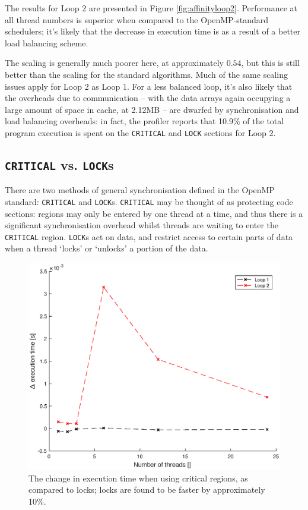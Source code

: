 \documentclass{article} %
\newcommand{\tp}{\texttt}
\begin{document}
The results for Loop 2 are presented in Figure \ref{fig:affinityloop2}.
Performance at all thread numbers is superior when compared to the OpenMP-standard schedulers;
it's likely that the decrease in execution time is as a result of a better load balancing scheme.

The scaling is generally much poorer here, at approximately $0.54$, but this is still better than the scaling for the standard algorithms.
Much of the same scaling issues apply for Loop 2 as Loop 1.
For a less balanced loop, it's also likely that the overheads due to communication -- with the data arrays again occupying a large amount of space in cache, at 2.12MB -- are dwarfed by synchronisation and load balancing overheads: in fact, the profiler reports that 10.9\% of the total program execution is spent on the \tp{CRITICAL} and \tp{LOCK} sections for Loop 2.

\subsection*{\tp{CRITICAL} vs. \tp{LOCK}s}\label{s:locks}

There are two methods of general synchronisation defined in the OpenMP standard: \tp{CRITICAL} and \tp{LOCK}s. 
\tp{CRITICAL} may be thought of as protecting code sections: regions may only be entered by one thread at a time, and thus there is a significant synchronisation overhead whilst threads are waiting to enter the \tp{CRITICAL} region.
\tp{LOCK}s act on data, and restrict access to certain parts of data when a thread `locks' or `unlocks' a portion of the data.


\begin{figure}
    \centering
    \includegraphics[height=.35\textheight]{part2_plots/criticalvslock}
    \caption{The change in execution time when using critical regions, as compared to locks; locks are found to be faster by approximately 10\%.}
    \label{fig:criticalvslock}
\end{figure}
\end{document}
